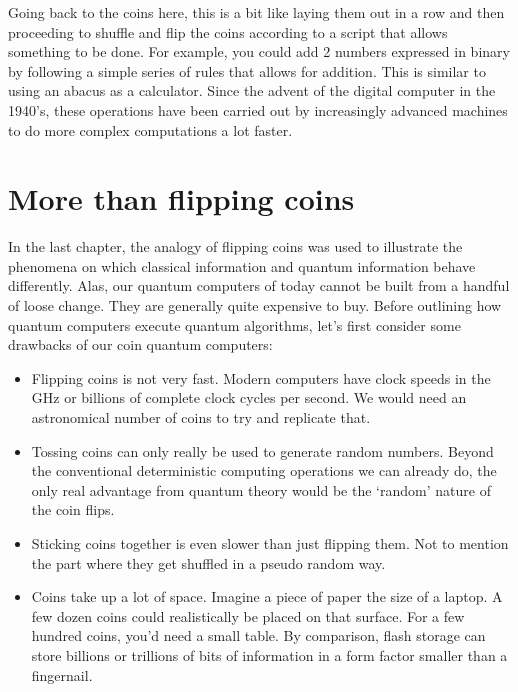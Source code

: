 \documentclass{book}
\begin{document}
Going back to the coins here, this is a bit like laying them out in a row and then proceeding to shuffle and flip the coins according to a script that allows something to be done. For example, you could add 2 numbers expressed in binary by following a simple series of rules that allows for addition. This is similar to using an abacus as a calculator. Since the advent of the digital computer in the 1940's, these operations have been carried out by increasingly advanced machines to do more complex computations a lot faster.

\section{More than flipping coins} 

In the last chapter, the analogy of flipping coins was used to illustrate the phenomena on which classical information and quantum information behave differently. Alas, our quantum computers of today cannot be built from a handful of loose change. They are generally quite expensive to buy. Before outlining how quantum computers execute quantum algorithms, let's first consider some drawbacks of our coin quantum computers: 

\begin{itemize}
    \item Flipping coins is not very fast. Modern computers have clock speeds in the GHz or billions of complete clock cycles per second. We would need an astronomical number of coins to try and replicate that. 
    
    \item Tossing coins can only really be used to generate random numbers. Beyond the conventional deterministic computing operations we can already do, the only real advantage from quantum theory would be the `random' nature of the coin flips. 
    
    \item Sticking coins together is even slower than just flipping them. Not to mention the part where they get shuffled in a pseudo random way. 
    
    \item Coins take up a lot of space. Imagine a piece of paper the size of a laptop. A few dozen coins could realistically be placed on that surface. For a few hundred coins, you'd need a small table. By comparison, flash storage can store billions or trillions of bits of information in a form factor smaller than a fingernail. 
 
\end{itemize}
\end{document}
